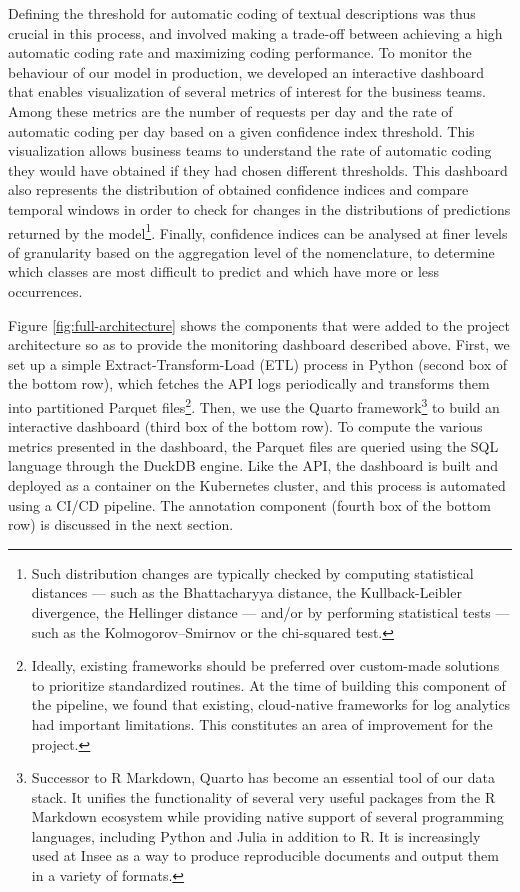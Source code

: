 \documentclass[graybox]{svmult}
\begin{document}
Defining the threshold for automatic coding of textual descriptions was thus crucial in this process, and involved making a trade-off between achieving a high automatic coding rate and maximizing coding performance. To monitor the behaviour of our model in production, we developed an interactive dashboard that enables visualization of several metrics of interest for the business teams. Among these metrics are the number of requests per day and the rate of automatic coding per day based on a given confidence index threshold. This visualization allows business teams to understand the rate of automatic coding they would have obtained if they had chosen different thresholds. This dashboard also represents the distribution of obtained confidence indices and compare temporal windows in order to check for changes in the distributions of predictions returned by the model\footnote{Such distribution changes are typically checked by computing statistical distances — such as the Bhattacharyya distance, the Kullback-Leibler divergence, the Hellinger distance — and/or by performing statistical tests — such as the Kolmogorov–Smirnov or the chi-squared test.}. Finally, confidence indices can be analysed at finer levels of granularity based on the aggregation level of the nomenclature, to determine which classes are most difficult to predict and which have more or less occurrences.

Figure \ref{fig:full-architecture} shows the components that were added to the project architecture so as to provide the monitoring dashboard described above. First, we set up a simple Extract-Transform-Load (ETL) process in Python (second box of the bottom row), which fetches the API logs periodically and transforms them into partitioned Parquet files\footnote{Ideally, existing frameworks should be preferred over custom-made solutions to prioritize standardized routines. At the time of building this component of the pipeline, we found that existing, cloud-native frameworks for log analytics had important limitations. This constitutes an area of improvement for the project.}. Then, we use the Quarto framework\footnote{Successor to R Markdown, Quarto has become an essential tool of our data stack. It unifies the functionality of several very useful packages from the R Markdown ecosystem while providing native support of several programming languages, including Python and Julia in addition to R. It is increasingly used at Insee as a way to produce reproducible documents and output them in a variety of formats.} to build an interactive dashboard (third box of the bottom row). To compute the various metrics presented in the dashboard, the Parquet files are queried using the SQL language through the DuckDB engine. Like the API, the dashboard is built and deployed as a container on the Kubernetes cluster, and this process is automated using a CI/CD pipeline. The annotation component (fourth box of the bottom row) is discussed in the next section.
\end{document}
